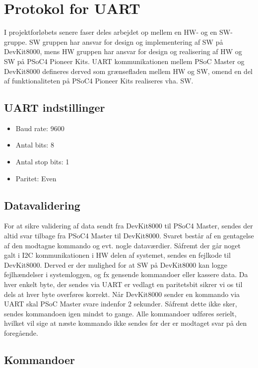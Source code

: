 \clearpage
\section{Protokol for UART} \label{UART_Protokol} %

I projektforløbets senere faser deles arbejdet op mellem en HW- og en SW-gruppe. SW gruppen har ansvar for design og implementering af SW på DevKit8000, mens HW gruppen har ansvar for design og realisering af HW og SW på PSoC4 Pioneer Kits. UART kommunikationen mellem PSoC Master og DevKit8000 defineres derved som grænsefladen mellem HW og SW, omend en del af funktionaliteten på PSoC4 Pioneer Kits realiseres vha. SW.

\subsection{UART indstillinger}

\begin{itemize}
\item Baud rate: 9600 
\item Antal bits: 8
\item Antal stop bits: 1
\item Paritet: Even
\end{itemize}

\subsection{Datavalidering}

For at sikre validering af data sendt fra DevKit8000 til PSoC4 Master, sendes der altid svar tilbage fra PSoC4 Master til DevKit8000. Svaret består af en gentagelse af den modtagne kommando og evt. nogle dataværdier. \newline
Såfremt der går noget galt i I2C kommunikationen i HW delen af systemet, sendes en fejlkode til DevKit8000. 
Derved er der mulighed for at SW på DevKit8000 kan logge fejlhændelser i systemloggen, og fx gensende kommandoer eller kassere data. \newline
Da hver enkelt byte, der sendes via UART er vedlagt en paritetsbit sikrer vi os til dels at hver byte overføres korrekt. \newline
Når DevKit8000 sender en kommando via UART skal PSoC Master svare indenfor 2 sekunder. Såfremt dette ikke sker, sendes kommandoen igen mindst to gange. Alle kommandoer udføres serielt, hvilket vil sige at næste kommando ikke sendes før der er modtaget svar på den foregående.

\subsection{Kommandoer}

